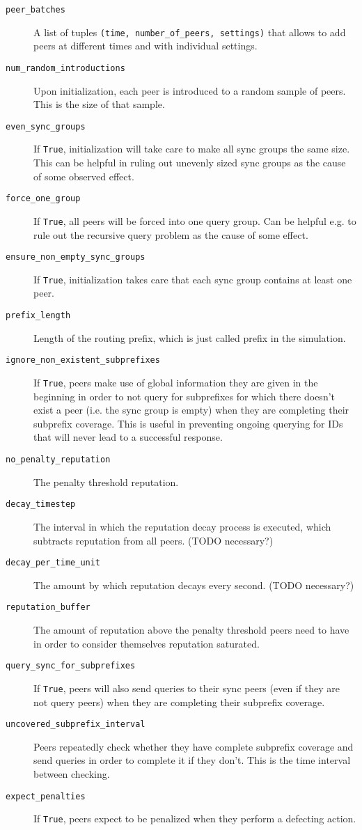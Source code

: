 \begin{description}
\item[\texttt{peer\_batches}] A list of tuples \texttt{(time, number\_of\_peers,
settings)} that allows to add peers at different times and with individual
settings.
\item[\texttt{num\_random\_introductions}] Upon initialization, each peer is
introduced to a random sample of peers. This is the size of that sample.
\item[\texttt{even\_sync\_groups}] If \texttt{True}, initialization will take
care to make all sync groups the same size. This can be helpful in ruling out
unevenly sized sync groups as the cause of some observed effect.
\item[\texttt{force\_one\_group}] If \texttt{True}, all peers will be forced
into one query group. Can be helpful e.g. to rule out the recursive query
problem as the cause of some effect.
\item[\texttt{ensure\_non\_empty\_sync\_groups}] If \texttt{True},
initialization takes care that each sync group contains at least one peer.
\item[\texttt{prefix\_length}] Length of the routing prefix, which is just
called prefix in the simulation.
\item[\texttt{ignore\_non\_existent\_subprefixes}] If \texttt{True}, peers make
use of global information they are given in the beginning in order to not query
for subprefixes for which there doesn't exist a peer (i.e. the sync group is
empty) when they are completing their subprefix coverage. This is useful in
preventing ongoing querying for IDs that will never lead to a successful
response.
\item[\texttt{no\_penalty\_reputation}] The penalty threshold reputation.
\item[\texttt{decay\_timestep}] The interval in which the reputation decay
process is executed, which subtracts reputation from all peers. (TODO
necessary?)
\item[\texttt{decay\_per\_time\_unit}] The amount by which reputation decays
every second. (TODO necessary?)
\item[\texttt{reputation\_buffer}] The amount of reputation above the penalty
threshold peers need to have in order to consider themselves reputation
saturated.
\item[\texttt{query\_sync\_for\_subprefixes}] If \texttt{True}, peers will also
send queries to their sync peers (even if they are not query peers) when they
are completing their subprefix coverage.
\item[\texttt{uncovered\_subprefix\_interval}] Peers repeatedly check whether
they have complete subprefix coverage and send queries in order to complete it
if they don't. This is the time interval between checking.
\item[\texttt{expect\_penalties}] If \texttt{True}, peers expect to be penalized
when they perform a defecting action.
\end{description}
